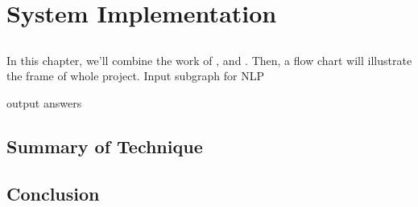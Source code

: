 \chapter{System Implementation}
\label{Ch-5:Sec:System}

\section{}

In this chapter, we'll combine the work of ,  and . Then, a flow chart will illustrate the frame of whole project.
Input subgraph for NLP

output answers


\section{Summary of Technique}

\section{Conclusion}
